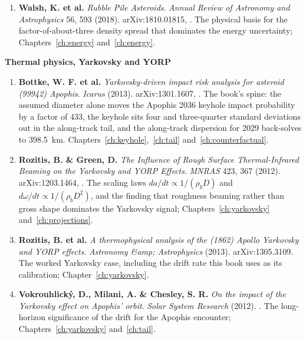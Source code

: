 \begin{enumerate}[leftmargin=2.9em,itemsep=4pt,resume]
\item \textbf{Walsh, K. et al.} \emph{Rubble Pile Asteroids}. \emph{Annual
Review of Astronomy and Astrophysics} 56, 593 (2018). arXiv:1810.01815,
. The physical basis for
the factor-of-about-three density spread that dominates the energy
uncertainty; Chapters~\ref{ch:energy} and~\ref{ch:energy}.

\end{enumerate}

\vspace{8pt}
{\sffamily\bfseries\small Thermal physics, Yarkovsky and YORP}

\begin{enumerate}[leftmargin=2.9em,itemsep=4pt,resume]

\item \textbf{Bottke, W. F. et al.} \emph{Yarkovsky-driven impact risk
analysis for asteroid (99942) Apophis}. \emph{Icarus} (2013). arXiv:1301.1607,
. The book's spine: the assumed
diameter alone moves the Apophis 2036 keyhole impact probability by a factor
of 433, the keyhole sits four and three-quarter standard deviations out in
the along-track tail, and the along-track dispersion for 2029 back-solves to
398.5~km. Chapters~\ref{ch:keyhole},~\ref{ch:tail} and~\ref{ch:counterfactual}.

\item \textbf{Rozitis, B. \& Green, D.} \emph{The Influence of Rough Surface
Thermal-Infrared Beaming on the Yarkovsky and YORP Effects}. \emph{MNRAS}
423, 367 (2012). arXiv:1203.1464,
. The scaling laws
\(da/dt \propto 1/(\rho_b D)\) and \(d\omega/dt \propto 1/(\rho_b D^{2})\),
and the finding that roughness beaming rather than gross shape dominates
the Yarkovsky signal; Chapters~\ref{ch:yarkovsky} and~\ref{ch:projections}.

\item \textbf{Rozitis, B. et al.} \emph{A thermophysical analysis of the
(1862) Apollo Yarkovsky and YORP effects}. \emph{Astronomy \&amp;
Astrophysics} (2013). arXiv:1305.3109. The worked Yarkovsky case, including
the drift rate this book uses as its calibration; Chapter~\ref{ch:yarkovsky}.

\item \textbf{Vokrouhlick\'y, D., Milani, A. \& Chesley, S. R.} \emph{On the
impact of the Yarkovsky effect on Apophis' orbit}. \emph{Solar System
Research} (2012). . The long-horizon
significance of the drift for the Apophis encounter;
Chapters~\ref{ch:yarkovsky} and~\ref{ch:tail}.


\end{enumerate}
